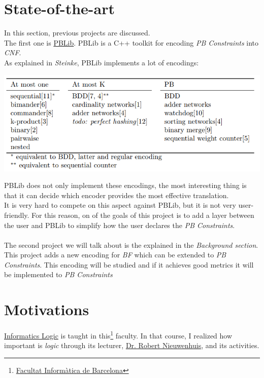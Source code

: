\section{State-of-the-art}

In this section, previous projects are discussed. \\
The first one is \href{http://tools.computational-logic.org/content/pblib.php}{PBLib}. PBLib is a C++ toolkit for encoding \emph{PB Constraints} into \emph{CNF}.\\
As explained in \emph{Steinke}\cite{Steinke2015}, PBLib implements a lot of encodings:
\begin{center}
	\includegraphics[width=1\textwidth]{Figures/PBLibEncodings.png}
\end{center}
PBLib does not only implement these encodings, the most interesting thing is that it can decide which encoder provides the most effective translation.\\
It is very hard to compete on this aspect against PBLib, but it is not very user-friendly. For this reason, on of the goals of this project is to add a layer between the user and PBLib to simplify how the user declares the \emph{PB Constraints}.\\\\

The second project we will talk about is the explained in the \emph{Background section}. This project adds a new encoding for \emph{BF} which can be extended to \emph{PB Constraints}. This encoding will be studied and if it achieves good metrics it will be implemented to \emph{PB Constraints}


\section{Motivations}

\href{https://www.fib.upc.edu/en/studies/bachelors-degrees/bachelor-degree-informatics-engineering/curriculum/syllabus/LI}{Informatics Logic} is taught in this\footnote{\href{https://www.fib.upc.edu/en/}{Facultat Informàtica de Barcelona}} faculty. In that course, I realized how important is \emph{logic} through its lecturer, \href{http://www.lsi.upc.es/~roberto/}{Dr. Robert Nieuwenhuis}, and its activities. \\

